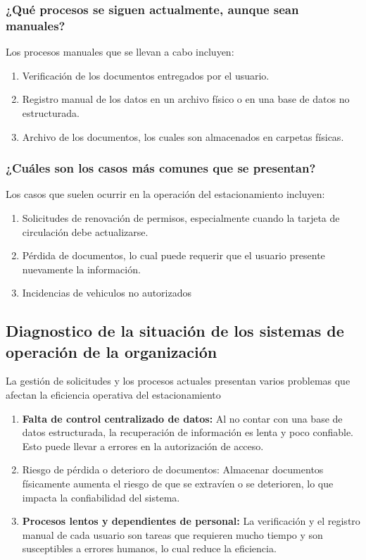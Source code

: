 {\subsubsection{¿Qué procesos se siguen actualmente, aunque sean manuales?}
Los procesos manuales que se llevan a cabo incluyen:
\begin{enumerate}

\item Verificación de los documentos entregados por el usuario.
\item  Registro manual de los datos en un archivo físico o en una base de datos
no estructurada.
\item Archivo de los documentos, los cuales son almacenados en carpetas físicas.
\end{enumerate}
\subsubsection{¿Cuáles son los casos más comunes que se presentan?}
Los casos que suelen ocurrir en la operación del estacionamiento incluyen:
\begin{enumerate}
\item Solicitudes de renovación de permisos, especialmente cuando la tarjeta de
circulación debe actualizarse.
\item  Pérdida de documentos, lo cual puede requerir que el usuario presente
nuevamente la información.
\item Incidencias de vehiculos no autorizados
\end{enumerate}
\subsection{Diagnostico de la situación de los sistemas de operación de la organización}
La gestión de solicitudes y los procesos actuales presentan varios problemas que
afectan la eficiencia operativa del estacionamiento
\begin{enumerate}
\item{ \textbf{Falta de control centralizado de datos:} Al no contar con una base
	de datos estructurada, la recuperación de información es lenta y poco
	confiable. Esto puede llevar a errores en la autorización de acceso.}
\item{ Riesgo de pérdida o deterioro de documentos: Almacenar documentos 
	físicamente aumenta el riesgo de que se extravíen o se deterioren,
	lo que impacta la confiabilidad del sistema.
}
\item {\textbf{Procesos lentos y dependientes de personal: }La verificación y el
	registro manual de cada usuario son tareas que requieren mucho tiempo y
	son susceptibles a errores humanos, lo cual reduce la eficiencia.}


\end{enumerate}}
